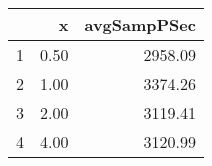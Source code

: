 \begin{table}[h]
\centering
\begin{tabular}{rrr}
  \hline
 & x & avgSampPSec \\ 
  \hline
1 & 0.50 & 2958.09 \\ 
   \hline
2 & 1.00 & 3374.26 \\ 
   \hline
3 & 2.00 & 3119.41 \\ 
   \hline
4 & 4.00 & 3120.99 \\ 
   \hline
\end{tabular}
\end{table}
